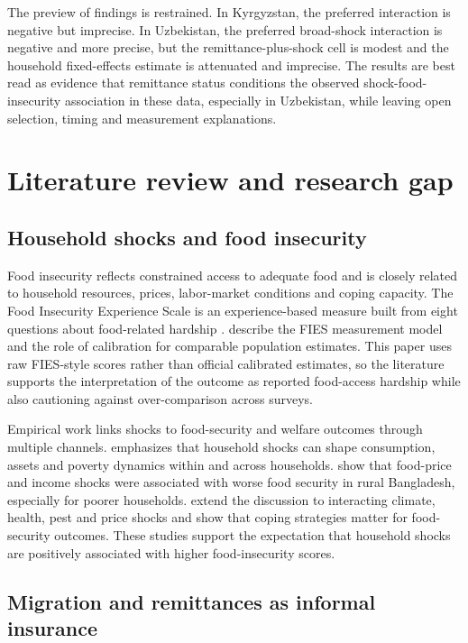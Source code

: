 \documentclass[11pt]{article}
\begin{document}
The preview of findings is restrained. In Kyrgyzstan, the preferred interaction is negative but imprecise. In Uzbekistan, the preferred broad-shock interaction is negative and more precise, but the remittance-plus-shock cell is modest and the household fixed-effects estimate is attenuated and imprecise. The results are best read as evidence that remittance status conditions the observed shock-food-insecurity association in these data, especially in Uzbekistan, while leaving open selection, timing and measurement explanations.

\section{Literature review and research gap}

\subsection{Household shocks and food insecurity}

Food insecurity reflects constrained access to adequate food and is closely related to household resources, prices, labor-market conditions and coping capacity. The Food Insecurity Experience Scale is an experience-based measure built from eight questions about food-related hardship \parencite{FAO2026}. \textcite{Cafiero2018} describe the FIES measurement model and the role of calibration for comparable population estimates. This paper uses raw FIES-style scores rather than official calibrated estimates, so the literature supports the interpretation of the outcome as reported food-access hardship while also cautioning against over-comparison across surveys.

Empirical work links shocks to food-security and welfare outcomes through multiple channels. \textcite{Hoddinott2006} emphasizes that household shocks can shape consumption, assets and poverty dynamics within and across households. \textcite{AkterBasher2014} show that food-price and income shocks were associated with worse food security in rural Bangladesh, especially for poorer households. \textcite{Ansah2021} extend the discussion to interacting climate, health, pest and price shocks and show that coping strategies matter for food-security outcomes. These studies support the expectation that household shocks are positively associated with higher food-insecurity scores.

\subsection{Migration and remittances as informal insurance}
\end{document}
